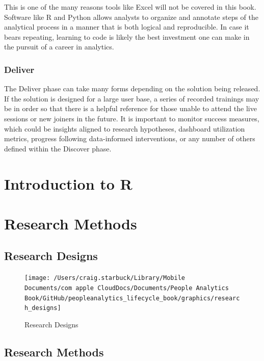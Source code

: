 \documentclass[]{book}
\begin{document}
This is one of the many reasons tools like Excel will not be covered in this book. Software like R and Python allows analysts to organize and annotate steps of the analytical process in a manner that is both logical and reproducible. In case it bears repeating, learning to code is likely the best investment one can make in the pursuit of a career in analytics.

\hypertarget{deliver}{%
\subsection{Deliver}\label{deliver}}

The Deliver phase can take many forms depending on the solution being released. If the solution is designed for a large user base, a series of recorded trainings may be in order so that there is a helpful reference for those unable to attend the live sessions or new joiners in the future. It is important to monitor success measures, which could be insights aligned to research hypotheses, dashboard utilization metrics, progress following data-informed interventions, or any number of others defined within the Discover phase.

\hypertarget{r-intro}{%
\chapter{Introduction to R}\label{r-intro}}

\hypertarget{methods}{%
\chapter{Research Methods}\label{methods}}

\hypertarget{research-designs}{%
\section{Research Designs}\label{research-designs}}

\begin{figure}

{\centering \texttt{[image: /Users/craig.starbuck/Library/Mobile Documents/com~apple~CloudDocs/Documents/People Analytics Book/GitHub/peopleanalytics\_lifecycle\_book/graphics/research\_designs]} 

}

\caption{Research Designs}\label{fig:res-designs}
\end{figure}

\hypertarget{research-methods}{%
\section{Research Methods}\label{research-methods}}
\end{document}
